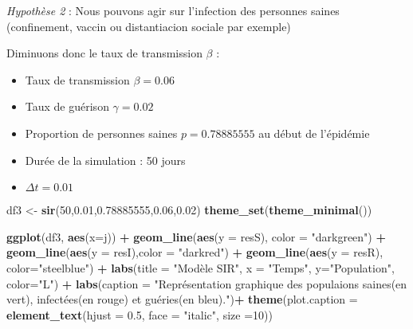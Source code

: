 \documentclass[
]{article}
\newenvironment{Shaded}{\begin{snugshade}}{\end{snugshade}}
\newcommand{\DataTypeTok}[1]{\textcolor[rgb]{0.13,0.29,0.53}{#1}}
\newcommand{\DecValTok}[1]{\textcolor[rgb]{0.00,0.00,0.81}{#1}}
\newcommand{\FloatTok}[1]{\textcolor[rgb]{0.00,0.00,0.81}{#1}}
\newcommand{\KeywordTok}[1]{\textcolor[rgb]{0.13,0.29,0.53}{\textbf{#1}}}
\newcommand{\NormalTok}[1]{#1}
\newcommand{\OperatorTok}[1]{\textcolor[rgb]{0.81,0.36,0.00}{\textbf{#1}}}
\newcommand{\StringTok}[1]{\textcolor[rgb]{0.31,0.60,0.02}{#1}}
\providecommand{\tightlist}{%
  \setlength{\itemsep}{0pt}\setlength{\parskip}{0pt}}
\begin{document}
\emph{Hypothèse 2} : Nous pouvons agir sur l'infection des personnes
saines (confinement, vaccin ou distantiacion sociale par exemple)

Diminuons donc le taux de transmission \(\beta\) :

\begin{itemize}
\tightlist
\item
  Taux de transmission \(\beta = 0.06\)
\item
  Taux de guérison \(\gamma=0.02\)
\item
  Proportion de personnes saines \(p=0.78885555\) au début de l'épidémie
\item
  Durée de la simulation : 50 jours
\item
  \(\Delta t= 0.01\)
\end{itemize}

\begin{Shaded}
\begin{Highlighting}[]
\NormalTok{df3 <-}\StringTok{ }\KeywordTok{sir}\NormalTok{(}\DecValTok{50}\NormalTok{,}\FloatTok{0.01}\NormalTok{,}\FloatTok{0.78885555}\NormalTok{,}\FloatTok{0.06}\NormalTok{,}\FloatTok{0.02}\NormalTok{)}
\KeywordTok{theme_set}\NormalTok{(}\KeywordTok{theme_minimal}\NormalTok{())}

\KeywordTok{ggplot}\NormalTok{(df3, }\KeywordTok{aes}\NormalTok{(}\DataTypeTok{x=}\NormalTok{j)) }\OperatorTok{+}\StringTok{ }\KeywordTok{geom_line}\NormalTok{(}\KeywordTok{aes}\NormalTok{(}\DataTypeTok{y =}\NormalTok{ resS), }\DataTypeTok{color =} \StringTok{"darkgreen"}\NormalTok{) }\OperatorTok{+}\StringTok{ }\KeywordTok{geom_line}\NormalTok{(}\KeywordTok{aes}\NormalTok{(}\DataTypeTok{y =}\NormalTok{ resI),}\DataTypeTok{color =} \StringTok{"darkred"}\NormalTok{) }\OperatorTok{+}\StringTok{ }\KeywordTok{geom_line}\NormalTok{(}\KeywordTok{aes}\NormalTok{(}\DataTypeTok{y =}\NormalTok{ resR), }\DataTypeTok{color=}\StringTok{"steelblue"}\NormalTok{) }\OperatorTok{+}\StringTok{ }\KeywordTok{labs}\NormalTok{(}\DataTypeTok{title =} \StringTok{"Modèle SIR"}\NormalTok{, }\DataTypeTok{x =} \StringTok{"Temps"}\NormalTok{, }\DataTypeTok{y=}\StringTok{"Population"}\NormalTok{, }\DataTypeTok{color=}\StringTok{"L"}\NormalTok{) }\OperatorTok{+}\StringTok{ }\KeywordTok{labs}\NormalTok{(}\DataTypeTok{caption =} \StringTok{"Représentation graphique des populaions saines(en vert), infectées(en rouge) et guéries(en bleu)."}\NormalTok{)}\OperatorTok{+}\StringTok{ }\KeywordTok{theme}\NormalTok{(}\DataTypeTok{plot.caption =} \KeywordTok{element_text}\NormalTok{(}\DataTypeTok{hjust =} \FloatTok{0.5}\NormalTok{, }\DataTypeTok{face =} \StringTok{"italic"}\NormalTok{, }\DataTypeTok{size =}\DecValTok{10}\NormalTok{))}
\end{Highlighting}
\end{Shaded}
\end{document}
